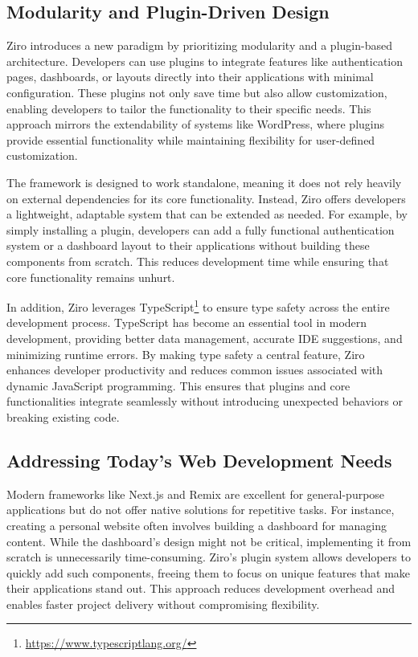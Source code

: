 \subsection{Modularity and Plugin-Driven Design}

Ziro introduces a new paradigm by prioritizing modularity and a plugin-based architecture. Developers can use plugins to integrate features like authentication pages, dashboards, or layouts directly into their applications with minimal configuration. These plugins not only save time but also allow customization, enabling developers to tailor the functionality to their specific needs. This approach mirrors the extendability of systems like WordPress, where plugins provide essential functionality while maintaining flexibility for user-defined customization.

The framework is designed to work standalone, meaning it does not rely heavily on external dependencies for its core functionality. Instead, Ziro offers developers a lightweight, adaptable system that can be extended as needed. For example, by simply installing a plugin, developers can add a fully functional authentication system or a dashboard layout to their applications without building these components from scratch. This reduces development time while ensuring that core functionality remains unhurt.

In addition, Ziro leverages TypeScript\footnote{\url{https://www.typescriptlang.org/}} to ensure type safety across the entire development process. TypeScript has become an essential tool in modern development, providing better data management, accurate IDE suggestions, and minimizing runtime errors. By making type safety a central feature, Ziro enhances developer productivity and reduces common issues associated with dynamic JavaScript programming. This ensures that plugins and core functionalities integrate seamlessly without introducing unexpected behaviors or breaking existing code.

\subsection{Addressing Today’s Web Development Needs}

Modern frameworks like Next.js and Remix are excellent for general-purpose applications but do not offer native solutions for repetitive tasks. For instance, creating a personal website often involves building a dashboard for managing content. While the dashboard’s design might not be critical, implementing it from scratch is unnecessarily time-consuming. Ziro’s plugin system allows developers to quickly add such components, freeing them to focus on unique features that make their applications stand out. This approach reduces development overhead and enables faster project delivery without compromising flexibility.

